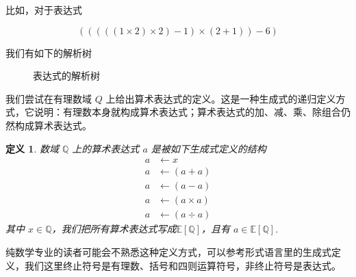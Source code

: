 \documentclass[a4paper,12pt]{book}
\numberwithin{problem}{section}
\newtheorem{definition}{定义}
\numberwithin{definition}{section}
\numberwithin{lemma}{section}
\numberwithin{proposition}{section}
\numberwithin{theorem}{section}
\numberwithin{grammar}{section}
\numberwithin{program}{section}
\numberwithin{convention}{section}
\numberwithin{corollary}{section}
\begin{document}
比如，对于表达式

\begin{equation}
(((((1 \times 2) \times 2) - 1) \times (2 + 1)) - 6)
\end{equation}

我们有如下的解析树

\begin{figure}[ht]
\centering
{}
\caption{表达式的解析树}\label{fig:syntaxtree}
\end{figure}

我们尝试在有理数域 $Q$ 上给出算术表达式的定义。这是一种生成式的递归定义方式，它说明：有理数本身就构成算术表达式；算术表达式的加、减、乘、除组合仍然构成算术表达式。

\begin{definition}\label{def:arithmetic-expression}
数域 $\mathbb{Q}$ 上的算术表达式 $a$ 是被如下生成式定义的结构
\begin{equation}\label{eq:productionrule}
\begin{aligned}
a &\longleftarrow x\\
a &\longleftarrow ( a + a )\\
a &\longleftarrow ( a - a )\\
a &\longleftarrow ( a \times a )\\
a &\longleftarrow ( a \div a )
\end{aligned}
\end{equation}
其中 $x \in \mathbb{Q}$，我们把所有算术表达式写成$\mathbb{E} \left [\mathbb{Q} \right ]$，且有 $a \in \mathbb{E} \left [\mathbb{Q} \right ]$.
\end{definition}

纯数学专业的读者可能会不熟悉这种定义方式，可以参考形式语言里的生成式定义，我们这里终止符号是有理数、括号和四则运算符号，非终止符号是表达式。
\end{document}
